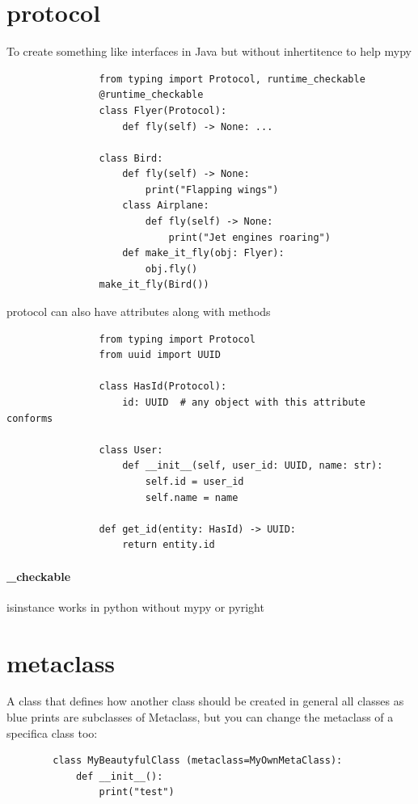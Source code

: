 \section{protocol}
    To create something like interfaces in Java but without inhertitence to help mypy
    \begin{verbatim}
                from typing import Protocol, runtime_checkable
                @runtime_checkable
                class Flyer(Protocol):
                    def fly(self) -> None: ...
    
                class Bird:
                    def fly(self) -> None:
                        print("Flapping wings")
                    class Airplane:
                        def fly(self) -> None:
                            print("Jet engines roaring")
                    def make_it_fly(obj: Flyer):
                        obj.fly()
                make_it_fly(Bird())
\end{verbatim}
    protocol can also have attributes along with methods
    \begin{verbatim}
                from typing import Protocol
                from uuid import UUID
    
                class HasId(Protocol):
                    id: UUID  # any object with this attribute conforms
    
                class User:
                    def __init__(self, user_id: UUID, name: str):
                        self.id = user_id
                        self.name = name
    
                def get_id(entity: HasId) -> UUID:
                    return entity.id
    \end{verbatim}
    \paragraph{\@runtime\_checkable}
        isinstance works in python without mypy or pyright

\section{metaclass}
    A class that defines how another class should be created in general all classes as blue prints are subclasses of Metaclass, but you can change the metaclass of a specifica class too:
    
    \begin{verbatim}
        class MyBeautyfulClass (metaclass=MyOwnMetaClass):
            def __init__():
                print("test")
    \end{verbatim}

